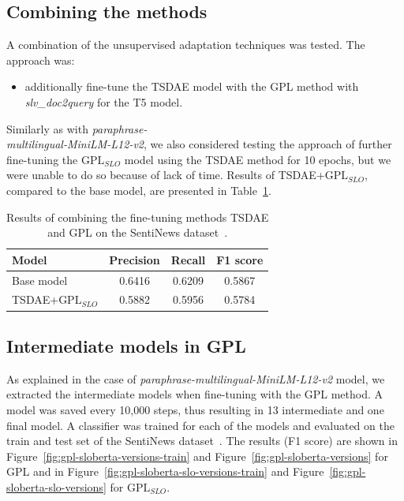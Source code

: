 \documentclass[fleqn,moreauthors,10pt]{ds_report}
\begin{document}
\subsection*{Combining the methods}
A combination of the unsupervised adaptation techniques was tested. The approach was:
\begin{itemize}
	\item additionally fine-tune the TSDAE model with the GPL method with {\it slv\_doc2query} for the T5 model.
\end{itemize}

Similarly as with {\it paraphrase-\\multilingual-MiniLM-L12-v2}, we also considered testing the approach of further fine-tuning the $\text{GPL}_{SLO}$ model using the TSDAE method for 10 epochs, but we were unable to do so because of lack of time. Results of TSDAE+$\text{GPL}_{SLO}$, compared to the base model, are presented in Table~\ref{tab5}.

\begin{table}[!h]
	\footnotesize
	\begin{center}
		\begin{tabular}{ |l|c|c|c| }
		\hline
		\rowcolor{Blue}Model & Precision & Recall & F1 score\\
		\hline

		Base model & 0.6416 & 0.6209 & 0.5867\\
		TSDAE+$\text{GPL}_{SLO}$ & 0.5882 & 0.5956 & 0.5784\\

		\hline
		\end{tabular}
	\end{center}
\caption{Results of combining the fine-tuning methods TSDAE and GPL on the SentiNews dataset~\cite{sentiNews}.}
\label{tab5}
\end{table}


\subsection*{Intermediate models in GPL}
As explained in the case of {\it paraphrase-multilingual-MiniLM-L12-v2} model, we extracted the intermediate models when fine-tuning with the GPL method. A model was saved every 10,000 steps, thus resulting in 13 intermediate and one final model. A classifier was trained for each of the models and evaluated on the train and test set of the SentiNews dataset~\cite{sentiNews}. The results (F1 score) are shown in Figure~\ref{fig:gpl-sloberta-versions-train} and Figure~\ref{fig:gpl-sloberta-versions} for GPL and in Figure~\ref{fig:gpl-sloberta-slo-versions-train} and Figure~\ref{fig:gpl-sloberta-slo-versions} for $\text{GPL}_{SLO}$.
\end{document}
